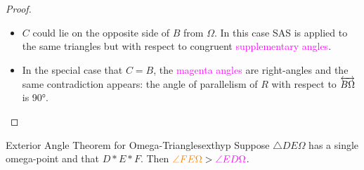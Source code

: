 \begin{proof}
\begin{minipage}[t]{0.29\linewidth}
	\end{minipage}\par
	\begin{itemize}
		\item $C$ could lie on the opposite side of $B$ from $\Omega$. In this case SAS is applied to the same triangles but with respect to congruent \textcolor{Magenta}{supplementary angles}.
	  \item In the special case that $C=B$, the \textcolor{Magenta}{magenta angles} are right-angles and the same contradiction appears: the angle of parallelism of $R$ with respect to $\overleftrightarrow{B\Omega}$ is \ang{90}.\qedhere
	\end{itemize}
\end{proof}

\goodbreak


\begin{thm}{Exterior Angle Theorem for Omega-Triangles}{exthyp}
	Suppose $\triangle DE\Omega$ has a single omega-point and that $D*E*F$. Then $\textcolor{orange}{\angle FE\Omega}>\textcolor{Magenta}{\angle ED\Omega}$.
\end{thm}

